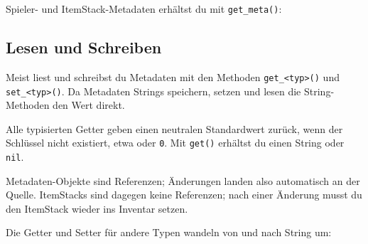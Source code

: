 Spieler- und ItemStack-Metadaten erhältst du mit
\texttt{get\_\allowbreak{}meta()}:

\begin{Shaded}
\begin{Highlighting}[]
  \OperatorTok{=} \OperatorTok{:}\OperatorTok{()}
  \OperatorTok{=} \OperatorTok{:}\OperatorTok{()}
\end{Highlighting}
\end{Shaded}

\subsection{Lesen und Schreiben}\label{lesen-und-schreiben}

Meist liest und schreibst du Metadaten mit den Methoden
\texttt{get\_\allowbreak{}<typ>()} und
\texttt{set\_\allowbreak{}<typ>()}. Da Metadaten Strings speichern,
setzen und lesen die String-Methoden den Wert direkt.

\begin{Shaded}
\begin{Highlighting}[]
\OperatorTok{(}\OperatorTok{:}\OperatorTok{(}\OperatorTok{))} 
\OperatorTok{:}\OperatorTok{(}\OperatorTok{,} \OperatorTok{)}
\OperatorTok{(}\OperatorTok{:}\OperatorTok{(}\OperatorTok{))} 
\end{Highlighting}
\end{Shaded}

Alle typisierten Getter geben einen neutralen Standardwert zurück, wenn
der Schlüssel nicht existiert, etwa
\texttt{\textquotedbl{}\textquotedbl{}} oder \texttt{0}. Mit
\texttt{get()} erhältst du einen String oder \texttt{nil}.

Metadaten-Objekte sind Referenzen; Änderungen landen also automatisch an
der Quelle. ItemStacks sind dagegen keine Referenzen; nach einer
Änderung musst du den ItemStack wieder ins
Inventar setzen.

Die Getter und Setter für andere Typen wandeln von und nach String um:

